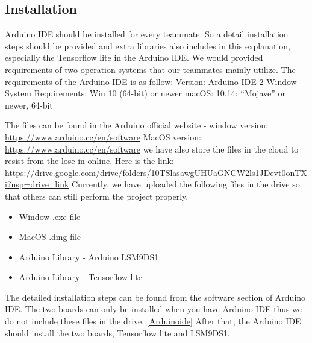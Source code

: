 	\subsection{Installation}
	Arduino IDE should be installed for every teammate. So a detail installation steps should be provided and extra libraries also includes in this explanation, especially the Tensorflow lite in the Arduino IDE. We would provided requirements of two operation systems that our teammates mainly utilize. The requirements of the Arduino IDE is as follow:
	Version: Arduino IDE 2
	Window System Requirements: Win 10 (64-bit) or newer
	macOS: 10.14: “Mojave” or newer, 64-bit
	
	The files can be found in the Arduino official website - window version: \url{https://www.arduino.cc/en/software}
	MacOS version: \url{https://www.arduino.cc/en/software}
	we have also store the files in the cloud to resist from the lose in online. Here is the link: \url{https://drive.google.com/drive/folders/10TSlasawgUHUaGNCW2ls1JDevt0onTXi?usp=drive_link} 
	Currently, we have uploaded the following files in the drive so that others can still perform the project properly. 
	\begin{itemize}
\item Window .exe file
\item MacOS .dmg file
\item Arduino Library - Arduino LSM9DS1
\item Arduino Library - Tensorflow lite
\end{itemize}
The detailed installation steps can be found from the software section of Arduino IDE. The two boards can only be installed when you have Arduino IDE thus we do not include these files in the drive. \ref{Arduinoide}
After that, the Arduino IDE should install the two boards, Tensorflow lite and LSM9DS1.
